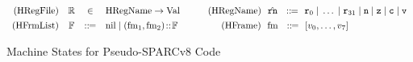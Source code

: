 \begin{figure*}[!t]
\[\begin{array}{rcclrcclrccl}
            \TYPE{(HRegFile)} & \hRfile & \in &   
            \multicolumn{9}{l}
            {
                \TYPE{HRegName} \rightarrow \TYPE{Val}
                \qquad\quad
                \TYPE{(HRegName)} \ \ \hrn \ \ \define \ \
                \reg{0} \sepline \dots \sepline \reg{31} \sepline 
                \regn \sepline \regz \sepline \regc \sepline \regv    
            }
            \\
            \\[-8pt]
            \TYPE{(HFrmList)} & \hWstk & \define & 
            \multicolumn{9}{l}
            {
                \nil \sepline (\fm_1, \fm_2) \stCons \hWstk
                \qquad\qquad \ \
                \TYPE{(HFrame)} \ \ \fm \ \ \define \ \  
                [\val_0, \dots, \val_7]
            }
        \end{array}
    \]
    \vspace{-1em}
    \caption{Machine States for Pseudo-SPARCv8 Code}
    \label{fig:machine-state-concur-pseudo-sparc}
    \vspace{-0.5em}
\end{figure*}


